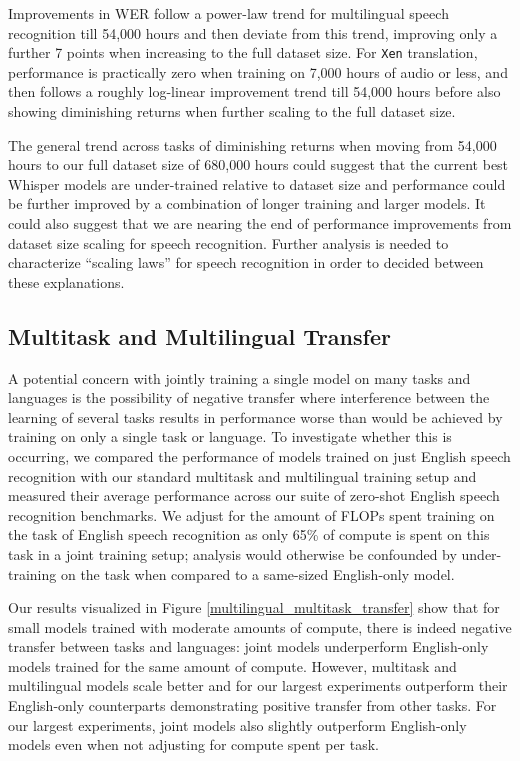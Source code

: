 \documentclass[nohyperref]{article}
\theoremstyle{plain}
\theoremstyle{definition}
\theoremstyle{remark}
\begin{document}
Improvements in WER follow a power-law trend for multilingual speech recognition till 54,000 hours and then deviate from this trend, improving only a further 7 points when increasing to the full dataset size. For \texttt{Xen} translation, performance is practically zero when training on 7,000 hours of audio or less, and then follows a roughly log-linear improvement trend till 54,000 hours before also showing diminishing returns when further scaling to the full dataset size.

The general trend across tasks of diminishing returns when moving from 54,000 hours to our full dataset size of 680,000 hours could suggest that the current best Whisper models are under-trained relative to dataset size and performance could be further improved by a combination of longer training and larger models. It could also suggest that we are nearing the end of performance improvements from dataset size scaling for speech recognition. Further analysis is needed to characterize ``scaling laws'' for speech recognition in order to decided between these explanations.


\subsection{Multitask and Multilingual Transfer}

A potential concern with jointly training a single model on many tasks and languages is the possibility of negative transfer where interference between the learning of several tasks results in performance worse than would be achieved by training on only a single task or language. To investigate whether this is occurring, we compared the performance of models trained on just English speech recognition with our standard multitask and multilingual training setup and measured their average performance across our suite of zero-shot English speech recognition benchmarks. We adjust for the amount of FLOPs spent training on the task of English speech recognition as only 65\% of compute is spent on this task in a joint training setup; analysis would otherwise be confounded by under-training on the task when compared to a same-sized English-only model.

Our results visualized in Figure \ref{multilingual_multitask_transfer} show that for small models trained with moderate amounts of compute, there is indeed negative transfer between tasks and languages: joint models underperform English-only models trained for the same amount of compute. However, multitask and multilingual models scale better and for our largest experiments outperform their English-only counterparts demonstrating positive transfer from other tasks. For our largest experiments, joint models also slightly outperform English-only models even when not adjusting for compute spent per task.
\end{document}

